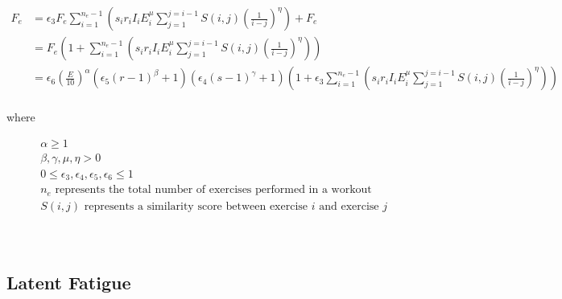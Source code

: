 \begin{minipage}{\textwidth}
	\begin{equation}
		\label{eq:P2C1_InterWorkoutFatigue}
		\begin{split}
			F_e & = 
			\epsilon_3 F_e 
			\sum_{i=1}^{n_e-1} \left( 
				s_i r_i I_i E_i^\mu 
				\sum_{j=1}^{j=i-1} S(i,j)\left(
					\frac{1}{i-j}
				\right)^\eta
			\right)
			+ F_e \\
			& = F_e \left(1+
				\sum_{i=1}^{n_e-1} \left( 
					s_i r_i I_i E_i^\mu 
					\sum_{j=1}^{j=i-1} S(i,j)\left(
						\frac{1}{i-j}
					\right)^\eta
				\right)
			\right)
			\\
			& = \epsilon_6 \left( \frac{E}{10} \right)^\alpha
				\left( \epsilon_5 (r-1)^\beta + 1 \right)
				\left(\epsilon_4 (s-1)^\gamma+1  \right)
				\left(
					1+\epsilon_3 \sum_{i=1}^{n_e-1} \left( 
						s_i r_i I_i E_i^\mu 
						\sum_{j=1}^{j=i-1} S(i,j)\left(
							\frac{1}{i-j}
						\right)^\eta
					\right)
				\right)
			\\
		\end{split}
	\end{equation}
	\centerline{where}
	\begin{equation*}
		\begin{split}
		    & \alpha \ge 1 \\
		    & \beta,\gamma, \mu, \eta > 0 \\
			& 0 \le \epsilon_3, \epsilon_4, \epsilon_5, \epsilon_6 \le 1 \\
			& n_e \text{ represents the total number of exercises performed in a workout} \\
			& S(i,j) \text{ represents a similarity score between exercise }i \text{ and exercise }j \\
		\end{split}
	\end{equation*}
\end{minipage}\\

\subsection{Latent Fatigue}
\label{sec:P2C1_LatentFatigue}

